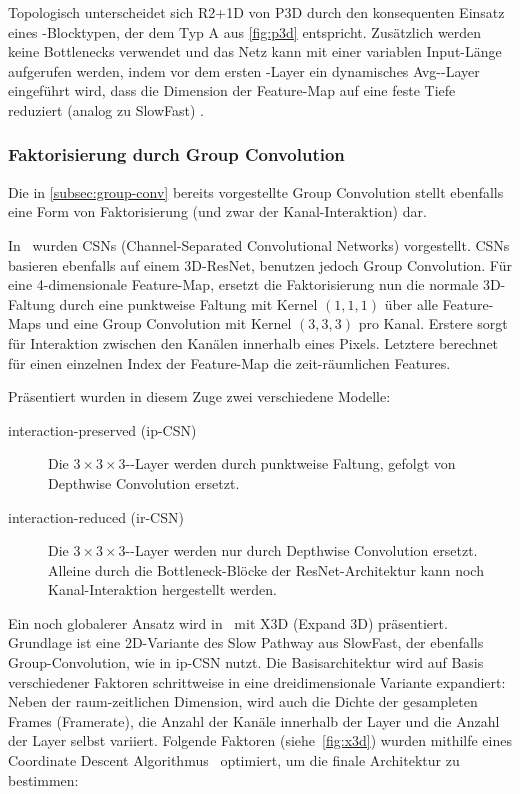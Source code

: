 Topologisch unterscheidet sich R2+1D von P3D durch den konsequenten Einsatz eines \res-Blocktypen, der dem Typ A aus \autoref{fig:p3d} entspricht.
Zusätzlich werden keine Bottlenecks verwendet und das Netz kann mit einer variablen Input-Länge aufgerufen werden, indem vor dem ersten \fc-Layer ein dynamisches Avg-\pool-Layer eingeführt wird, dass die Dimension der Feature-Map auf eine feste Tiefe reduziert (analog zu SlowFast) .

\subsubsection{Faktorisierung durch Group Convolution}

Die in \autoref{subsec:group-conv} bereits vorgestellte Group Convolution stellt ebenfalls eine Form von Faktorisierung (und zwar der Kanal-Interaktion) dar.

In~\cite{Tran19} wurden CSNs (Channel-Separated Convolutional Networks) vorgestellt.
CSNs basieren ebenfalls auf einem 3D-ResNet, benutzen jedoch Group Convolution.
Für eine 4-dimensionale Feature-Map, ersetzt die Faktorisierung nun die normale 3D-Faltung durch eine punktweise Faltung mit Kernel $(1, 1, 1)$ über alle Feature-Maps und eine Group Convolution mit Kernel $(3, 3, 3)$ pro Kanal.
Erstere sorgt für Interaktion zwischen den Kanälen innerhalb eines Pixels.
Letztere berechnet für einen einzelnen Index der Feature-Map die zeit-räumlichen Features.

Präsentiert wurden in diesem Zuge zwei verschiedene Modelle:
\begin{description}
    \item[interaction-preserved (ip-CSN)] Die $3 \times 3 \times 3$-\conv-Layer werden durch punktweise Faltung, gefolgt von Depthwise Convolution ersetzt.
    \item[interaction-reduced (ir-CSN)]  Die $3 \times 3 \times 3$-\conv-Layer werden nur durch Depthwise Convolution ersetzt.
    Alleine durch die Bottleneck-Blöcke der ResNet-Architektur kann noch Kanal-Interaktion hergestellt werden.
\end{description}

Ein noch globalerer Ansatz wird in~\cite{Feichtenhofer20} mit X3D (Expand 3D) präsentiert.
Grundlage ist eine 2D-Variante des Slow Pathway aus SlowFast, der ebenfalls Group-Convolution, wie in ip-CSN nutzt.
Die Basisarchitektur wird auf Basis verschiedener Faktoren schrittweise in eine dreidimensionale Variante expandiert:
Neben der raum-zeitlichen Dimension, wird auch die Dichte der gesampleten Frames (Framerate), die Anzahl der Kanäle innerhalb der Layer und die Anzahl der Layer selbst variiert.
Folgende Faktoren (siehe~\autoref{fig:x3d}) wurden mithilfe eines Coordinate Descent Algorithmus~\cite{Wright15} optimiert, um die finale Architektur zu bestimmen:

